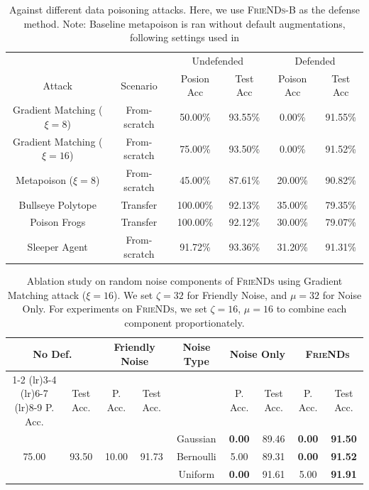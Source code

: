 \documentclass{article}
\newcommand{\alg}{\textsc{FrieNDs}}
\begin{document}
\begin{table}[t]
    \centering
    \caption{Against different data poisoning attacks. Here, we use \alg-B as the defense method. Note: Baseline metapoison is ran without default augmentations, following settings used in \citep{geiping2021doesn,huang2020metapoison}}
    \begin{tabular}{c|c|cc|cc}
    \toprule
    & & \multicolumn{2}{c|}{Undefended} & \multicolumn{2}{c}{Defended} \\
    Attack & Scenario & Posion Acc & Test Acc & Poison Acc & Test Acc \\  
    \midrule
    Gradient Matching ($\xi=8$) & From-scratch & 50.00\% & 93.55\% & 0.00\% & 91.55\%  \\
    Gradient Matching ($\xi=16$) & From-scratch & 75.00\% & 93.50\% & 0.00\% & 91.52\% \\
    Metapoison ($\xi=8$) & From-scratch & 45.00\% & 87.61\% & 20.00\% & 90.82\% \\
    Bullseye Polytope & Transfer & 100.00\% & 92.13\% & 35.00\% & 79.35\% \\
    Poison Frogs & Transfer & 100.00\% & 92.12\% & 30.00\% & 79.07\% \\
    Sleeper Agent & From-scratch & 91.72\% & 93.36\% & 31.20\% & 91.31\% \\
    \bottomrule
    \end{tabular}
    \label{tab:attacks}
\end{table}

\begin{table}[h]
    \centering
    \footnotesize
    \caption{Ablation study on random noise components of \alg{} using Gradient Matching attack ($\xi=16$). We set $\zeta=32$ for Friendly Noise, and $\mu=32$ for Noise Only. For experiments on \alg{}, we set $\zeta=16$, $\mu=16$ to combine each component proportionately.}
    \begin{tabular}{cc|cc|c|cc|cc}
    \toprule
     \multicolumn{2}{c|}{No Def.} & \multicolumn{2}{c|}{Friendly Noise} & \multirow{2}{*}{Noise Type} & \multicolumn{2}{c}{Noise Only} & \multicolumn{2}{c}{\alg} \\
    \cmidrule(lr){1-2} \cmidrule(lr){3-4} \cmidrule(lr){6-7} \cmidrule(lr){8-9}
    P. Acc. & Test Acc. & P. Acc. & Test Acc. & & P. Acc. & Test Acc. & P. Acc. & Test Acc. \\
    \midrule
    & & & & Gaussian & \textbf{0.00} & 89.46 & \textbf{0.00} & \textbf{91.50} \\
    75.00 & 93.50 & 10.00 & 91.73 & Bernoulli & 5.00 & 89.31 & \textbf{0.00} & \textbf{91.52} \\
     & & & & Uniform & \textbf{0.00} & 91.61 & 5.00 & \textbf{91.91}\\
    \bottomrule
    \end{tabular}
    \label{tab:noise}
\end{table}
\end{document}
